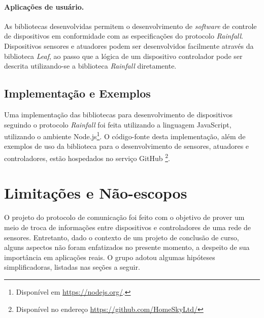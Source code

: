 \paragraph*{Aplicações de usuário.} As bibliotecas desenvolvidas permitem o desenvolvimento de \textit{software} de controle de dispositivos em conformidade com as especificações do protocolo \textit{Rainfall}. Dispositivos sensores e atuadores podem ser desenvolvidos facilmente através da biblioteca \textit{Leaf}, ao passo que a lógica de um dispositivo controlador pode ser descrita utilizando-se a biblioteca \textit{Rainfall} diretamente.

\subsection{Implementação e Exemplos}
Uma implementação das bibliotecas para desenvolvimento de dispositivos seguindo o protocolo \textit{Rainfall} foi feita utilizando a linguagem JavaScript, utilizando o ambiente Node.js\footnote{Disponível em \url{https://nodejs.org/}.}. O código-fonte desta implementação, além de exemplos de uso da biblioteca para o desenvolvimento de sensores, atuadores e controladores, estão hospedados no serviço GitHub \footnote{Disponível no endereço \url{https://github.com/HomeSkyLtd/}}.

\section{Limitações e Não-escopos}
O projeto do protocolo de comunicação foi feito com o objetivo de prover um meio de troca de informações entre dispositivos e controladores de uma rede de sensores. Entretanto, dado o contexto de um projeto de conclusão de curso, alguns aspectos não foram enfatizados no presente momento, a despeito de sua importância em aplicações reais. O grupo adotou algumas hipóteses simplificadoras, listadas nas seções a seguir.

